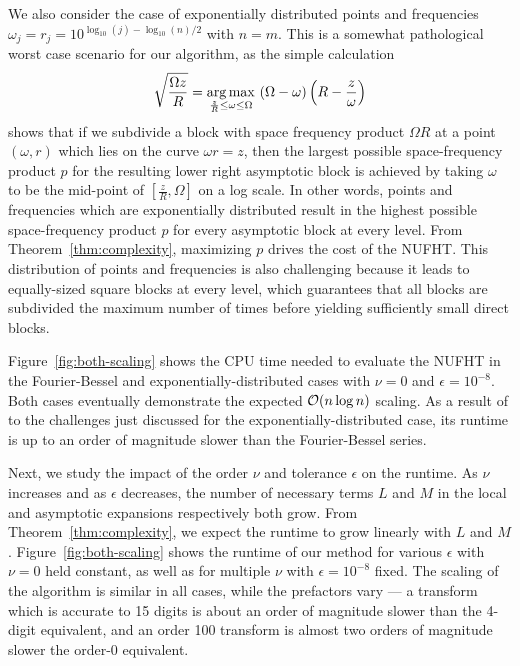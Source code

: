 We also consider the case of exponentially distributed points and frequencies
$\omega_j = r_j = 10^{\log_{10}(j) - \log_{10}(n)/2}$ with $n = m$. This is a
somewhat pathological worst case scenario for our algorithm, as the simple
calculation
\begin{equation}
  \sqrt{\frac{\Omega z}{R}} = \operatorname*{arg\,max}_{\frac{z}{R} \leq \omega \leq \Omega} \ (\Omega - \omega)\left(R - \frac{z}{\omega}\right)
\end{equation}
shows that if we subdivide a block with space frequency product $\Omega R$ at a
point $(\omega, r)$ which lies on the curve $\omega r = z$, then the largest
possible space-frequency product $p$ for the resulting lower right asymptotic
block is achieved by taking $\omega$ to be the mid-point of $[\frac{z}{R},
\Omega]$ on a log scale. In other words, points and frequencies which are
exponentially distributed result in the highest possible space-frequency product
$p$ for every asymptotic block at every level. From
Theorem~\ref{thm:complexity}, maximizing $p$ drives the cost of the NUFHT. This
distribution of points and frequencies is also challenging because it leads to
equally-sized square blocks at every level, which guarantees that all blocks are
subdivided the maximum number of times before yielding sufficiently small direct
blocks.

Figure~\ref{fig:both-scaling} shows the CPU time needed to evaluate the NUFHT in
the Fourier-Bessel and exponentially-distributed cases with $\nu=0$ and
$\epsilon=10^{-8}$. Both cases eventually demonstrate the expected $\mathcal{O}(n\log
n)$ scaling. As a result of to the challenges just discussed for the
exponentially-distributed case, its runtime is up to an order of magnitude
slower than the Fourier-Bessel series.

Next, we study the impact of the order $\nu$ and tolerance $\epsilon$ on the
runtime. As $\nu$ increases and as $\epsilon$ decreases, the number of necessary
terms $L$ and $M$ in the local and asymptotic expansions respectively both grow.
From Theorem~\ref{thm:complexity}, we expect the runtime to grow linearly with
$L$ and $M$. Figure~\ref{fig:both-scaling} shows the runtime of our method for
various $\epsilon$ with $\nu=0$ held constant, as well as for multiple $\nu$
with $\epsilon=10^{-8}$ fixed. The scaling of the algorithm is similar in all
cases, while the prefactors vary --- a transform which is accurate to 15 digits
is about an order of magnitude slower than the 4-digit equivalent, and an order
100 transform is almost two orders of magnitude slower the order-0 equivalent.

